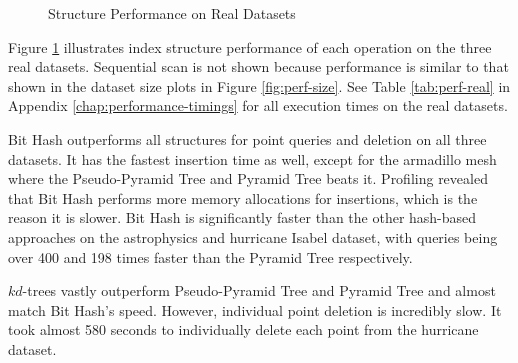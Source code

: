 \begin{figure}
	\caption{Structure Performance on Real Datasets}
	\label{fig:perf-real}
\end{figure}

Figure \ref{fig:perf-real} illustrates index structure performance of each operation on the three real datasets. Sequential scan is not shown because performance is similar to that shown in the dataset size plots in Figure \ref{fig:perf-size}. See Table \ref{tab:perf-real} in Appendix \ref{chap:performance-timings} for all execution times on the real datasets.

Bit Hash outperforms all structures for point queries and deletion on all three datasets. It has the fastest insertion time as well, except for the armadillo mesh where the Pseudo-Pyramid Tree and Pyramid Tree beats it. Profiling revealed that Bit Hash performs more memory allocations for insertions, which is the reason it is slower. Bit Hash is significantly faster than the other hash-based approaches on the astrophysics and hurricane Isabel dataset, with queries being over 400 and 198 times faster than the Pyramid Tree respectively.

$kd$-trees vastly outperform Pseudo-Pyramid Tree and Pyramid Tree and almost match Bit Hash's speed. However, individual point deletion is incredibly slow. It took almost 580 seconds to individually delete each point from the hurricane dataset.

